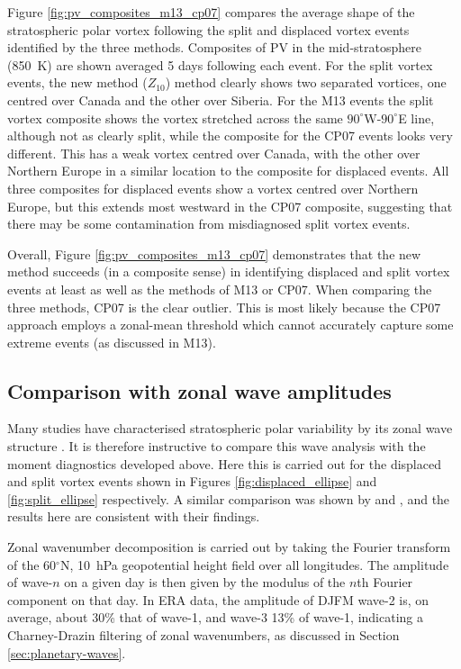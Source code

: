Figure \ref{fig:pv_composites_m13_cp07} compares the average shape of the
stratospheric polar vortex following the split and displaced vortex events
identified by the three methods. Composites of PV in the mid-stratosphere
(850~K) are shown averaged 5 days following each event. For the split vortex
events, the new method ($Z_{10}$) method clearly shows two separated
vortices, one centred over Canada and the other over Siberia. For the M13 events
the split vortex composite shows the vortex stretched across the same
$90^{\circ}$W-$90^{\circ}$E line, although not as clearly split, while the
composite for the CP07 events looks very different. This has a weak vortex
centred over Canada, with the other over Northern Europe in a similar location
to the composite for displaced events. All three composites for displaced events
show a vortex centred over Northern Europe, but this extends most westward in
the CP07 composite, suggesting that there may be some contamination from
misdiagnosed split vortex events.

Overall, Figure \ref{fig:pv_composites_m13_cp07} demonstrates that the new
method succeeds (in a composite sense) in identifying displaced and split vortex
events at least as well as the methods of M13 or CP07. When comparing the three
methods, CP07 is the clear outlier. This is most likely because the CP07
approach employs a zonal-mean threshold which cannot accurately capture some
extreme events (as discussed in M13).


\subsection{Comparison with zonal wave amplitudes}
\label{sec:comp-zonal-wave}

Many studies have characterised stratospheric polar variability by its zonal
wave structure \citep[e.g,][]{Randel1988,Yoden1999,Nakagawa2006,Bancala2012}. It
is therefore instructive to compare this wave analysis with the moment
diagnostics developed above. Here this is carried out for the displaced and
split vortex events shown in Figures \ref{fig:displaced_ellipse} and
\ref{fig:split_ellipse} respectively. A similar comparison was shown by
\citet{Waugh1997} and \citet{Waugh1999}, and the results here are consistent
with their findings.

Zonal wavenumber decomposition is carried out by taking the Fourier transform of
the 60$^{\circ}$N, 10~hPa geopotential height field over all longitudes. The
amplitude of wave-$n$ on a given day is then given by the modulus of the $n$th
Fourier component on that day. In ERA data, the amplitude of DJFM wave-2 is, on
average, about 30\% that of wave-1, and wave-3 13\% of wave-1, indicating a
Charney-Drazin filtering of zonal wavenumbers, as discussed in Section
\ref{sec:planetary-waves}.

